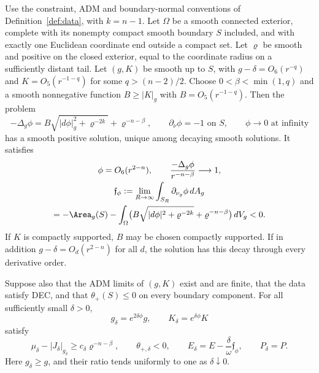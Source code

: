 \begin{lemma}\label{lem:end:strict}
Use the constraint, ADM and boundary-normal conventions of
Definition~\ref{def:data}, with $k=n-1$.
Let $\Omega$ be a smooth connected exterior, complete with its
nonempty compact smooth boundary $S$ included, and with exactly one
Euclidean coordinate end outside a compact set. Let $\varrho$ be smooth
and positive on the closed exterior, equal to the coordinate radius on
a sufficiently distant tail.  Let $(g,K)$ be
smooth up to $S$, with $g-\delta=O_6(r^{-q})$ and
$K=O_5(r^{-1-q})$ for some $q>(n-2)/2$.  Choose $0<\beta<\min(1,q)$ and a smooth
nonnegative function $B\ge|K|_g$ with
$B=O_5(r^{-1-q})$.  Then the problem
\begin{equation}\label{eq:end:strict-pde}
 -\Delta_g\phi
 =B\sqrt{|d\phi|_g^2+\varrho^{-2k}}+\varrho^{-n-\beta},
 \qquad \partial_\nu\phi=-1\text{ on }S,
 \qquad \phi\longrightarrow0\text{ at infinity}
\end{equation}
has a smooth positive solution, unique among decaying smooth
solutions.  It satisfies
\begin{equation}\label{eq:end:strict-estimates}
\begin{gathered}
 \phi=O_6(r^{2-n}),\qquad
 \frac{-\Delta_g\phi}{r^{-n-\beta}}\longrightarrow1,\\
 \mathfrak f_\phi:=\lim_{R\to\infty}
          \int_{S_R}\partial_{\nu_g}\phi\,dA_g\\
 =-\Area_g(S)-\int_\Omega
       \bigl(B\sqrt{|d\phi|^2+\varrho^{-2k}}
                    +\varrho^{-n-\beta}\bigr)\,dV_g<0.
\end{gathered}
\end{equation}
If $K$ is compactly supported, $B$ may be chosen compactly
supported.  If in addition $g-\delta=O_d(r^{2-n})$ for all $d$,
the solution has this decay through every derivative order.

Suppose also that the ADM limits of $(g,K)$ exist and are finite,
that the data satisfy DEC, and that $\theta_+(S)\le0$ on every
boundary component.  For all sufficiently small $\delta>0$,
\[
 g_\delta=e^{2\delta\phi}g,\qquad
 K_\delta=e^{\delta\phi}K
\]
satisfy
\begin{equation}\label{eq:end:strict-margin}
 \mu_\delta-|J_\delta|_{g_\delta}\ge c_\delta\varrho^{-n-\beta},
 \qquad \theta_{+,\delta}<0,
 \qquad E_\delta=E-\frac{\delta}{\omega}\mathfrak f_\phi,
 \qquad P_\delta=P.
\end{equation}
Here $g_\delta\ge g$, and their ratio tends uniformly to one
as $\delta\downarrow0$.
\end{lemma}

